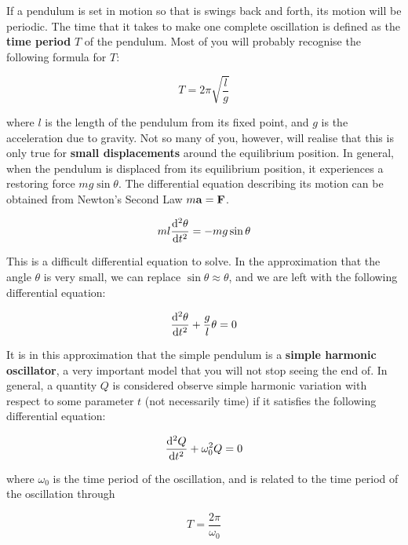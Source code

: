 If a pendulum is set in motion so that is swings back and forth, its motion will be periodic. The time that it takes to make one complete oscillation is defined as the \textbf{time period} $T$ of the pendulum. Most of you will probably recognise the following formula for $T$: 

\begin{equation}
    T = 2 \pi \sqrt{\frac{l}{g}} 
    \label{TimeP}
\end{equation}

where $l$ is the length of the pendulum from its fixed point, and $g$ is the acceleration due to gravity. Not so many of you, however, will realise that this is only true for \textbf{small displacements} around the equilibrium position. In general, when the pendulum is displaced from its equilibrium position, it experiences a restoring force $m g \sin\theta$. The differential equation describing its motion can be obtained from Newton's Second Law  $m\vb{a} = \vb{F}$.

\begin{equation}
    m l \dv[2]{\theta}{t} = - m g \sin\theta
\end{equation}

This is a difficult differential equation to solve. In the approximation that the angle $\theta$ is very small, we can replace $\sin\theta \approx \theta$, and we are left with the following differential equation:

\begin{equation}
    \dv[2]{\theta}{t} + \frac{g}{l} \theta = 0
\end{equation}

It is in this approximation that the simple pendulum is a \textbf{simple harmonic oscillator}, a very important model that you will not stop seeing the end of. In general, a quantity $Q$ is considered observe simple harmonic variation with respect to some parameter $t$ (not necessarily time) if it satisfies the following differential equation:

\begin{equation*}
    \dv[2]{Q}{t} + \omega_0^2 Q = 0
\end{equation*}

where $\omega_0$ is the time period of the oscillation, and is related to the time period of the oscillation through 

\begin{equation*}
    T = \frac{2\pi}{\omega_0}
\end{equation*}

